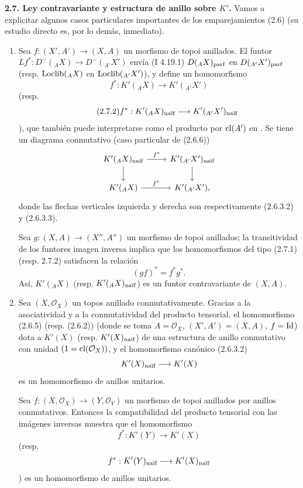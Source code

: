 \textbf{2.7. Ley contravariante y estructura de anillo sobre \(K'\).} Vamos a explicitar algunos casos particulares importantes de los emparejamientos (2.6) (su estudio directo es, por lo demás, inmediato).
\begin{enumerate}[label=\alph*)]
\item Sea \(f:(X',A')\longrightarrow (X,A)\) un morfismo de topoi anillados. El funtor \(Lf^*:D^-({}_A X)\longrightarrow D^-({}_{A'} X')\) envía (I 4.19.1) \(D({}_A X)_{\parf}\) en \(D({}_{A'} X')_{\parf}\) (resp. \(\Loclib({}_A X)\) en \(\Loclib({}_{A'} X')\)), y define un homomorfismo
\begin{equation}\tag{2.7.1}
 f^*:K'({}_A X)\longrightarrow K'({}_{A'} X')
\end{equation}
(resp.
\begin{equation}\tag{2.7.2}
 f^*:K'({}_A X)_{\naif}\longrightarrow K'({}_{A'} X')_{\naif}
\end{equation}
), que también puede interpretarse como el producto por \(\cl(A')\) en . Se tiene un diagrama conmutativo (caso particular de (2.6.6))
\[
\begin{tikzcd}
K'({}_A X)_{\naif}\arrow[r,"f^*"]\arrow[d]
&K'({}_{A'} X')_{\naif}\arrow[d]\\
K'({}_A X)\arrow[r,"f^*"]
&K'({}_{A'} X'),
\end{tikzcd}
\]
donde las flechas verticales izquierda y derecha son respectivamente (2.6.3.2) y (2.6.3.3).

Sea \(g:(X,A)\to(X'',A'')\) un morfismo de topoi anillados; la transitividad de los funtores imagen inversa implica que los homomorfismos del tipo (2.7.1) (resp. 2.7.2) satisfacen la relación
\begin{equation}\tag{2.7.3}
 (gf)^*=f^*g^*.
\end{equation}
Así, \(K'({}_A X)\) (resp. \(K'({}_A X)_{\naif}\)) es un funtor contravariante de \((X,A)\).

\item Sea \((X,\mathcal O_X)\) un topos anillado conmutativamente. Gracias a la asociatividad y a la conmutatividad del producto tensorial, el homomorfismo (2.6.5) (resp. (2.6.2)) (donde se toma \(A=\mathcal O_X\), \((X',A')=(X,A)\), \(f=\Id\)) dota a \(K'(X)\) (resp. \(K'(X)_{\naif}\)) de una estructura de anillo conmutativo con unidad \((1=\cl(\mathcal O_X))\), y el homomorfismo canónico (2.6.3.2)
\[
 K'(X)_{\naif}\longrightarrow K'(X)
\]
es un homomorfismo de anillos unitarios.

Sea \(f:(X,\mathcal O_X)\to(Y,\mathcal O_Y)\) un morfismo de topoi anillados por anillos conmutativos. Entonces la compatibilidad del producto tensorial con las imágenes inversas muestra que el homomorfismo
\[
 f^*:K'(Y)\longrightarrow K'(X)
\]
(resp.
\[
 f^*:K'(Y)_{\naif}\longrightarrow K'(X)_{\naif}
\]
) es un homomorfismo de anillos unitarios.
\end{enumerate}

